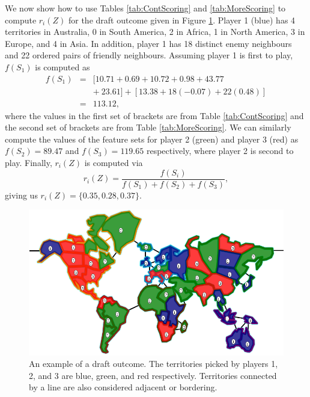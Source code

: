 \documentclass[letterpaper]{article}
\numberwithin{equation}{section}
\numberwithin{theorem}{section}
\numberwithin{lemma}{section}
\numberwithin{df}{section}
\begin{document}
We now show how to use Tables \ref{tab:ContScoring} and \ref{tab:MoreScoring} to compute $r_i(Z)$ for the draft outcome given in Figure \ref{fig:DraftExample}.  Player 1 (blue) has 4 territories in Australia, 0 in South America, 2 in Africa, 1 in North America, 3 in Europe, and 4 in Asia.  In addition, player 1 has 18 distinct enemy neighbours and 22 ordered pairs of friendly neighbours.  Assuming player 1 is first to play, $f(S_1)$ is computed as
\begin{eqnarray*}
 	f(S_1) &=& [10.71 + 0.69 + 10.72 + 0.98 + 43.77 \\ &&+\ 23.61] + [13.38 + 18(-0.07) + 22(0.48)] \\
 				 &=& 113.12,
\end{eqnarray*}
where the values in the first set of brackets are from Table \ref{tab:ContScoring} and the second set of brackets are from Table \ref{tab:MoreScoring}.  We can similarly compute the values of the feature sets for player 2 (green) and player 3 (red) as %
$f(S_2) = 89.47$ and $f(S_3) = 119.65$ respectively, where player 2 is second to play.  Finally, $r_i(Z)$ is computed via
\[ r_i(Z) = \frac{f(S_i)}{f(S_1) + f(S_2) + f(S_3)}, \]
giving us %
$r_i(Z) = \{0.35, 0.28, 0.37\}$.

\begin{figure}[t]
	\centering
	\includegraphics[scale=0.3]{figs/DraftExample.png}
	\caption{An example of a draft outcome.  The territories picked by players 1, 2, and 3 are blue, green, and red respectively.  Territories connected by a line are also considered adjacent or bordering.}
	\label{fig:DraftExample}
\end{figure}
\end{document}
